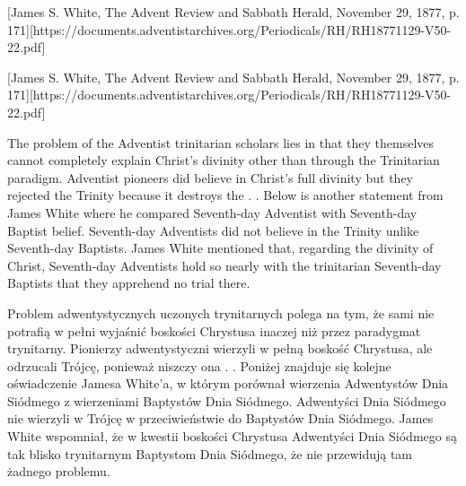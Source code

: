 

[James S. White, The Advent Review and Sabbath Herald, November 29, 1877, p. 171][https://documents.adventistarchives.org/Periodicals/RH/RH18771129-V50-22.pdf]


[James S. White, The Advent Review and Sabbath Herald, November 29, 1877, p. 171][https://documents.adventistarchives.org/Periodicals/RH/RH18771129-V50-22.pdf]


The problem of the Adventist trinitarian scholars lies in that they themselves cannot completely explain Christ’s divinity other than through the Trinitarian paradigm. Adventist pioneers did believe in Christ’s full divinity but they rejected the Trinity because it destroys the . . Below is another statement from James White where he compared Seventh-day Adventist with Seventh-day Baptist belief. Seventh-day Adventists did not believe in the Trinity unlike Seventh-day Baptists. James White mentioned that, regarding the divinity of Christ, Seventh-day Adventists hold so nearly with the trinitarian Seventh-day Baptists that they apprehend no trial there.


Problem adwentystycznych uczonych trynitarnych polega na tym, że sami nie potrafią w pełni wyjaśnić boskości Chrystusa inaczej niż przez paradygmat trynitarny. Pionierzy adwentystyczni wierzyli w pełną boskość Chrystusa, ale odrzucali Trójcę, ponieważ niszczy ona . . Poniżej znajduje się kolejne oświadczenie Jamesa White'a, w którym porównał wierzenia Adwentystów Dnia Siódmego z wierzeniami Baptystów Dnia Siódmego. Adwentyści Dnia Siódmego nie wierzyli w Trójcę w przeciwieństwie do Baptystów Dnia Siódmego. James White wspomniał, że w kwestii boskości Chrystusa Adwentyści Dnia Siódmego są tak blisko trynitarnym Baptystom Dnia Siódmego, że nie przewidują tam żadnego problemu.


